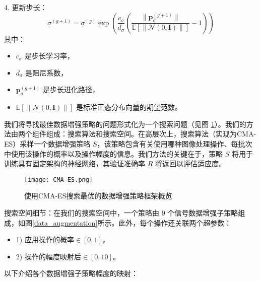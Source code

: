 \documentclass[master]{thesis-uestc}
\begin{document}
4. 更新步长：
\begin{equation}
\sigma^{(g+1)} = \sigma^{(g)} \exp\left(\frac{c_\sigma}{d_\sigma} \left(\frac{\|\mathbf{p}_\sigma^{(g+1)}\|}{\mathbb{E}[\|\mathcal{N}(0, \mathbf{I})\|]} - 1\right)\right)
\label{eq:stepsize_update}
\end{equation}
其中：
\begin{itemize}
    \item \(c_\sigma\) 是步长学习率，
    \item \(d_\sigma\) 是阻尼系数，
    \item \(\mathbf{p}_\sigma^{(g+1)}\) 是步长进化路径，
    \item \(\mathbb{E}[\|\mathcal{N}(0, \mathbf{I})\|]\) 是标准正态分布向量的期望范数。
\end{itemize}

我们将寻找最佳数据增强策略的问题形式化为一个搜索问题（见图 \ref{CMA-ES}）。我们的方法由两个组件组成：搜索算法和搜索空间。在高层次上，搜索算法（实现为CMA-ES）采样一个数据增强策略 \( S \)，该策略包含有关使用哪种图像处理操作、每批次中使用该操作的概率以及操作幅度的信息。我们方法的关键在于，策略 \( S \) 将用于训练具有固定架构的神经网络，其验证准确率 \( R \) 将返回以评估适应度。
\begin{figure}[h]
    \centering
    \texttt{[image: CMA-ES.png]}
    \caption{使用CMA-ES搜索最优的数据增强策略框架概览}
    \label{CMA-ES}
\end{figure}
搜索空间细节：在我们的搜索空间中，一个策略由 9 个信号数据增强子策略组成，如图\ref{data_augmentation}所示。此外，每个操作还关联两个超参数：
\begin{itemize}
    \item 1) 应用操作的概率\(\in [0,1]\)，
    \item 2) 操作的幅度映射后\(\in [0,10]\)。
\end{itemize}
以下介绍各个数据增强子策略幅度的映射：
\end{document}
